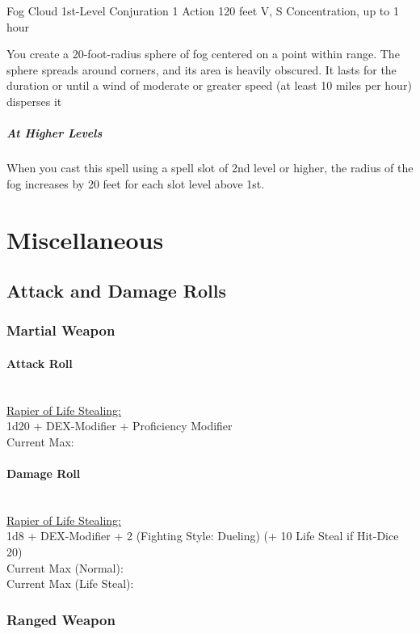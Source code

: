 \documentclass[letterpaper,openany,oneside,twocolumn]{book}
\begin{document}
\DndSpellHeader
  {Fog Cloud}
  {1st-Level Conjuration}
  {1 Action}
  {120 feet}
  {V, S}
  {Concentration, up to 1 hour}

You create a 20-foot-radius sphere of fog centered on a point within range. The sphere spreads around corners, and its area is heavily obscured. It lasts for the duration or until a wind of moderate or greater speed (at least 10 miles per hour) disperses it

\subparagraph*{At Higher Levels} When you cast this spell using a spell slot of 2nd level or higher, the radius of the fog increases by 20 feet for each slot level above 1st.

\section*{Miscellaneous}
\subsection*{Attack and Damage Rolls}
\subsubsection*{Martial Weapon}
\paragraph*{Attack Roll}\hfill\\
\underline{Rapier of Life Stealing:}\\
1d20 + DEX-Modifier + Proficiency Modifier\\
\indent Current Max: 
\paragraph*{Damage Roll}\hfill\\
\underline{Rapier of Life Stealing:}\\
1d8 + DEX-Modifier + 2 (Fighting Style: Dueling) (+ 10 Life Steal if Hit-Dice 20)\\
\indent Current Max (Normal): \\
\indent Current Max (Life Steal): 
\subsubsection*{Ranged Weapon}
\end{document}
